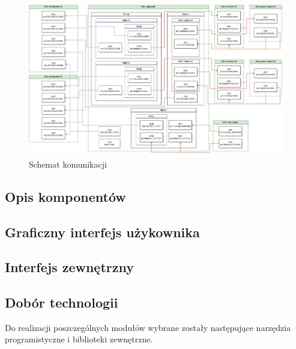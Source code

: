\documentclass[15pt]{sprawozdanie}
\begin{document}
\newpage
 \begin{figure}[!h]
  \centering
  \includegraphics[width=1.2\textwidth, angle=90]{ZMQinMINIUAV.drawio.png}
  \caption{Schemat komunikacji}
  \label{comm}
 \end{figure}

\newpage


\subsection{Opis komponentów}



\newpage

\subsection{Graficzny interfejs użykownika}



\newpage

\subsection{Interfejs zewnętrzny}



\newpage


\subsection{Dobór technologii}

Do realizacji poszczególnych modułów wybrane zostały następujące narzędzia programistyczne i biblioteki zewnętrzne.\\
\end{document}
